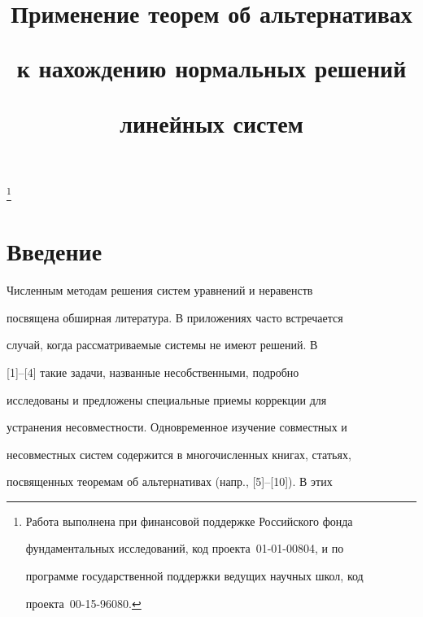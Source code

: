 

\title{Применение теорем об альтернативах


к нахождению нормальных решений


линейных систем}


\thanks{Работа выполнена при финансовой поддержке Российского фонда


фундаментальных исследований, код проекта \No\,01-01-00804, и по


программе государственной поддержки ведущих научных школ, код


проекта \No\,00-15-96080.}





\date{}




\pagestyle{plain} %







\maketitle


\label{begin}








\section{Введение}





Численным методам решения систем уравнений и неравенств


посвящена обширная литература. В приложениях часто встречается


случай, когда рассматриваемые системы не имеют решений. В


[1]--[4] такие задачи, названные несобственными, подробно


исследованы и предложены специальные приемы коррекции для


устранения несовместности. Одновременное изучение совместных и


несовместных систем содержится в многочисленных книгах, статьях,


посвященных теоремам об альтернативах (напр., [5]--[10]). В этих



